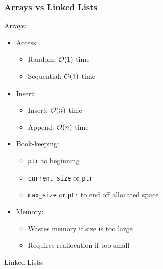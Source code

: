 \subsubsection{Arrays vs Linked Lists}
Arrays:
\begin{itemize}
	\item Access:
	\begin{itemize}
		\item Random: $\mathcal{O}(1)$ time
		\item Sequential: $\mathcal{O}(1)$ time
	\end{itemize}

	\item Insert:
	\begin{itemize}
		\item Insert: $\mathcal{O}(n)$ time
		\item Append: $\mathcal{O}(n)$ time
	\end{itemize}

	\item Book-keeping:
	\begin{itemize}
		\item \lstinline[style=C++]{ptr} to beginning
		\item \lstinline[style=C++]{current_size} or \lstinline[style=C++]{ptr}
		\item \lstinline[style=C++]{max_size} or \lstinline[style=C++]{ptr} to end off allocated space
	\end{itemize}

	\item Memory:
	\begin{itemize}
		\item Wastes memory if size is too large
		\item Requires reallocation if too small
	\end{itemize}
\end{itemize}
Linked Lists:
